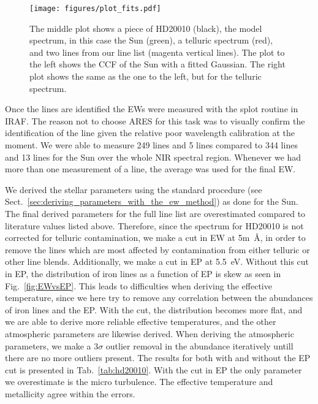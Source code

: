 \documentclass{aa}
\begin{document}
\begin{figure}[tbp!]
    \centering
    \texttt{[image: figures/plot\_fits.pdf]}
    \caption{The middle plot shows a piece of HD20010 (black), the model
    spectrum, in this case the Sun (green), a telluric spectrum (red), and two
    lines from our line list (magenta vertical lines). The plot to the left
    shows the CCF of the Sun with a fitted Gaussian. The right plot shows the
    same as the one to the left, but for the telluric spectrum.}
    \label{fig:plot_fits}
\end{figure}

Once the lines are identified the EWs were measured with the splot
routine in IRAF. The reason not to choose ARES for this task was to
visually confirm the identification of the line given the relative
poor wavelength calibration at the moment. We were able to measure 249
 lines and 5  lines compared to 344 
lines and 13  lines for the Sun over the whole NIR spectral
region. Whenever we had more than one measurement of a line, the average
was used for the final EW.

We derived the stellar parameters using the standard procedure
(see Sect.~\ref{sec:deriving_parameters_with_the_ew_method}) as
done for the Sun. The final derived parameters for the full line
list are overestimated compared to literature values listed above.
Therefore, since the spectrum for HD20010 is not corrected for
telluric contamination, we make a cut in EW at 5\si{m\angstrom},
in order to remove the lines which are most affected by contamination
from either telluric or other line blends. Additionally, we make a cut
in EP at \SI{5.5}{eV}. Without this cut in EP, the distribution of
iron lines as a function of EP is skew as seen in Fig.~\ref{fig:EWvsEP}.
This leads to difficulties when deriving the effective temperature, since
we here try to remove any correlation between the abundances of iron
lines and the EP. With the cut, the distribution becomes more flat,
and we are able to derive more reliable effective temperatures, and
the other atmospheric parameters are likewise derived.
When deriving the atmospheric parameters, we make a $3 \sigma$ outlier
removal in the abundance iteratively untill there are no more outliers present.
The results for both with and without the EP cut is presented in Tab.~\ref{tab:hd20010}.
With the cut in EP the only parameter we overestimate is the micro turbulence.
The effective temperature and metallicity agree within the errors.
\end{document}
